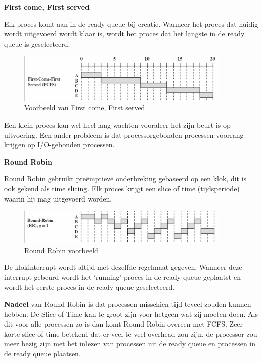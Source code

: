 \textbf{First come, First served}

Elk proces komt aan in de ready queue bij creatie. Wanneer het proces dat huidig wordt uitgevoerd wordt klaar is, wordt het proces dat het langste in de ready queue is geselecteerd.


\begin{figure}[htp]
    \centering
            \includegraphics[width=4in]{img/firstcomefirstserved.png}
        \caption{Voorbeeld van First come, First served}
    \label{fig:First come, First served voorbeeld}
\end{figure}

Een klein proces kan wel heel lang wachten vooraleer het zijn beurt is op uitvoering. Een ander probleem is dat processorgebonden processen voorrang krijgen op I/O-gebonden processen.

\textbf{Round Robin}

Round Robin gebruikt preëmptieve onderbreking gebaseerd op een klok, dit is ook gekend als time slicing. Elk proces krijgt een slice of time (tijdsperiode) waarin hij mag uitgevoerd worden.


\begin{figure}[htp]
    \centering
            \includegraphics[width=4in]{img/roundrobin.png}
        \caption{Round Robin voorbeeld}
    \label{fig:Round Robin voorbeeld}
\end{figure}

De klokinterrupt wordt altijd met dezelfde regelmaat gegeven. Wanneer deze interrupt gebeurd wordt het ‘running’ proces in de ready queue geplaatst en wordt het eerste proces in de ready queue geselecteerd.

\textbf{Nadeel} van Round Robin is dat processen misschien tijd teveel zouden kunnen hebben. De Slice of Time kan te groot zijn voor hetgeen wat zij moeten doen. Als dit voor alle processen zo is dan komt Round Robin overeen met FCFS. Zeer korte slice of time betekent dat er veel te veel overhead zou zijn, de processor zou meer bezig zijn met het inlezen van processen uit de ready queue en processen in de ready queue plaatsen.

